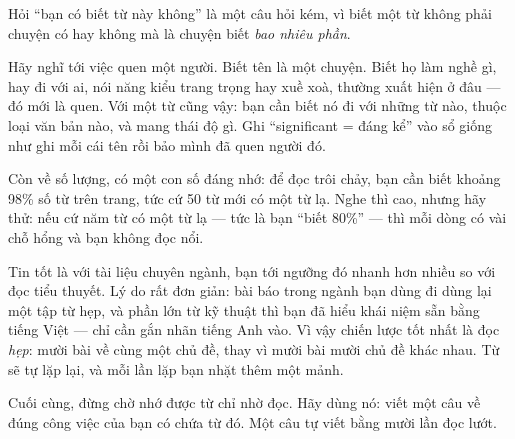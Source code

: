 \documentclass[../../english.tex]{subfiles}
\begin{document}
\begin{dongian}
Hỏi ``bạn có biết từ này không'' là một câu hỏi kém, vì biết một từ không phải chuyện có hay không mà là chuyện biết \emph{bao nhiêu phần}.

Hãy nghĩ tới việc quen một người. Biết tên là một chuyện. Biết họ làm nghề gì, hay đi với ai, nói năng kiểu trang trọng hay xuề xoà, thường xuất hiện ở đâu --- đó mới là quen. Với một từ cũng vậy: bạn cần biết nó đi với những từ nào, thuộc loại văn bản nào, và mang thái độ gì. Ghi ``significant = đáng kể'' vào sổ giống như ghi mỗi cái tên rồi bảo mình đã quen người đó.

Còn về số lượng, có một con số đáng nhớ: để đọc trôi chảy, bạn cần biết khoảng 98\% số từ trên trang, tức cứ 50 từ mới có một từ lạ. Nghe thì cao, nhưng hãy thử: nếu cứ năm từ có một từ lạ --- tức là bạn ``biết 80\%'' --- thì mỗi dòng có vài chỗ hổng và bạn không đọc nổi.

Tin tốt là với tài liệu chuyên ngành, bạn tới ngưỡng đó nhanh hơn nhiều so với đọc tiểu thuyết. Lý do rất đơn giản: bài báo trong ngành bạn dùng đi dùng lại một tập từ hẹp, và phần lớn từ kỹ thuật thì bạn đã hiểu khái niệm sẵn bằng tiếng Việt --- chỉ cần gắn nhãn tiếng Anh vào. Vì vậy chiến lược tốt nhất là đọc \emph{hẹp}: mười bài về cùng một chủ đề, thay vì mười bài mười chủ đề khác nhau. Từ sẽ tự lặp lại, và mỗi lần lặp bạn nhặt thêm một mảnh.

Cuối cùng, đừng chờ nhớ được từ chỉ nhờ đọc. Hãy dùng nó: viết một câu về đúng công việc của bạn có chứa từ đó. Một câu tự viết bằng mười lần đọc lướt.
\end{dongian}
\end{document}
